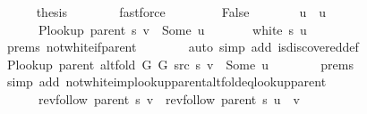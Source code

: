 \begin{isabellebody}
\ \ \ \ \isamarkupfalse%
\ {\isacharquery}{\kern0pt}thesis\isanewline
\ \ \ \ \ \ \isamarkupfalse%
\ fastforce\isanewline
\ \ \isamarkupfalse%
\isanewline
\ \ \ \ \isamarkupfalse%
\ False\isanewline
\ \ \ \ \isamarkupfalse%
\ \isamarkupfalse%
\ u\ \ u{\isacharcolon}{\kern0pt}\isanewline
\ \ \ \ \ \ {\isachardoublequoteopen}P{\isacharunderscore}{\kern0pt}lookup\ {\isacharparenleft}{\kern0pt}parent\ s{\isacharparenright}{\kern0pt}\ v\ {\isacharequal}{\kern0pt}\ Some\ u{\isachardoublequoteclose}\isanewline
\ \ \ \ \ \ {\isachardoublequoteopen}{\isasymnot}\ white\ s\ u{\isachardoublequoteclose}\isanewline
\ \ \ \ \ \ \isamarkupfalse%
\ {\isachardoublequoteopen}{}{\isachardot}{\kern0pt}prems{\isachardoublequoteclose}{\isacharparenleft}{\kern0pt}{}{\isacharparenright}{\kern0pt}\ not{\isacharunderscore}{\kern0pt}white{\isacharunderscore}{\kern0pt}if{\isacharunderscore}{\kern0pt}parent\isanewline
\ \ \ \ \ \ \isamarkupfalse%
\ {\isacharparenleft}{\kern0pt}auto\ simp\ add{\isacharcolon}{\kern0pt}\ is{\isacharunderscore}{\kern0pt}discovered{\isacharunderscore}{\kern0pt}def{\isacharparenright}{\kern0pt}\isanewline
\ \ \ \ \isamarkupfalse%
\ \isamarkupfalse%
\ {\isachardoublequoteopen}P{\isacharunderscore}{\kern0pt}lookup\ {\isacharparenleft}{\kern0pt}parent\ {\isacharparenleft}{\kern0pt}alt{\isacharunderscore}{\kern0pt}fold\ G{}\ G{}\ src\ s{\isacharparenright}{\kern0pt}{\isacharparenright}{\kern0pt}\ v\ {\isacharequal}{\kern0pt}\ Some\ u{\isachardoublequoteclose}\isanewline
\ \ \ \ \ \ \isamarkupfalse%
\ {\isachardoublequoteopen}{}{\isachardot}{\kern0pt}prems{\isachardoublequoteclose}\isanewline
\ \ \ \ \ \ \isamarkupfalse%
\ {\isacharparenleft}{\kern0pt}simp\ add{\isacharcolon}{\kern0pt}\ not{\isacharunderscore}{\kern0pt}white{\isacharunderscore}{\kern0pt}imp{\isacharunderscore}{\kern0pt}lookup{\isacharunderscore}{\kern0pt}parent{\isacharunderscore}{\kern0pt}alt{\isacharunderscore}{\kern0pt}fold{\isacharunderscore}{\kern0pt}eq{\isacharunderscore}{\kern0pt}lookup{\isacharunderscore}{\kern0pt}parent{\isacharparenright}{\kern0pt}\isanewline
\ \ \ \ \isamarkupfalse%
\ \isamarkupfalse%
\isanewline
\ \ \ \ \ \ {\isachardoublequoteopen}rev{\isacharunderscore}{\kern0pt}follow\ {\isacharparenleft}{\kern0pt}parent\ s{\isacharparenright}{\kern0pt}\ v\ {\isacharequal}{\kern0pt}\ rev{\isacharunderscore}{\kern0pt}follow\ {\isacharparenleft}{\kern0pt}parent\ s{\isacharparenright}{\kern0pt}\ u\ {\isacharat}{\kern0pt}\ {\isacharbrackleft}{\kern0pt}v{\isacharbrackright}{\kern0pt}{\isachardoublequoteclose}\isanewline

\end{isabellebody}
